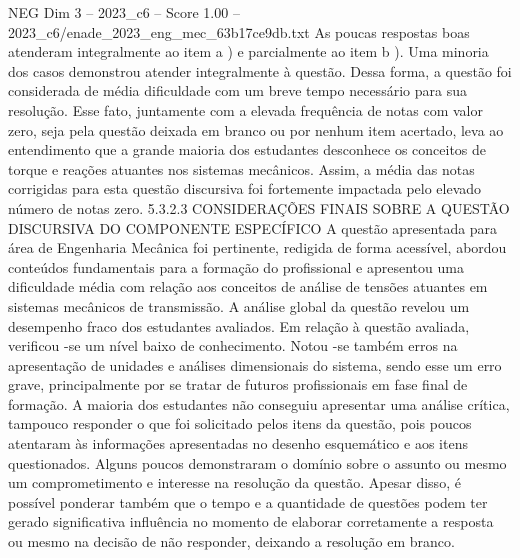 \begin{textsample}{NEG Dim 3 – 2023\_c6 – Score 1.00 – 2023\_c6/enade\_2023\_eng\_mec\_63b17ce9db.txt}
As poucas respostas boas atenderam integralmente ao item a ) e parcialmente ao item b ).
Uma minoria dos casos demonstrou atender integralmente à questão.
Dessa forma, a questão foi considerada de média dificuldade com um breve tempo necessário para sua resolução.
Esse fato, juntamente com a elevada frequência de notas com valor zero, seja pela questão deixada em branco ou por nenhum item acertado, leva ao entendimento que a grande maioria dos estudantes desconhece os conceitos de torque e reações atuantes nos sistemas mecânicos.
Assim, a média das notas corrigidas para esta questão discursiva foi fortemente impactada pelo elevado número de notas zero. 5.3.2.3 CONSIDERAÇÕES FINAIS SOBRE A QUESTÃO DISCURSIVA DO COMPONENTE ESPECÍFICO A questão apresentada para área de Engenharia Mecânica foi pertinente, redigida de forma acessível, abordou conteúdos fundamentais para a formação do profissional e apresentou uma dificuldade média com relação aos conceitos de análise de tensões atuantes em sistemas mecânicos de transmissão.
A análise global da questão revelou um desempenho fraco dos estudantes avaliados.
Em relação à questão avaliada, verificou -se um nível baixo de conhecimento.
Notou -se também erros na apresentação de unidades e análises dimensionais do sistema, sendo esse um erro grave, principalmente por se tratar de futuros profissionais em fase final de formação.
A maioria dos estudantes não conseguiu apresentar uma análise crítica, tampouco responder o que foi solicitado pelos itens da questão, pois poucos atentaram às informações apresentadas no desenho esquemático e aos itens questionados.
Alguns poucos demonstraram o domínio sobre o assunto ou mesmo um comprometimento e interesse na resolução da questão.
Apesar disso, é possível ponderar também que o tempo e a quantidade de questões podem ter gerado significativa influência no momento de elaborar corretamente a resposta ou mesmo na decisão de não responder, deixando a resolução em branco.

\end{textsample}
